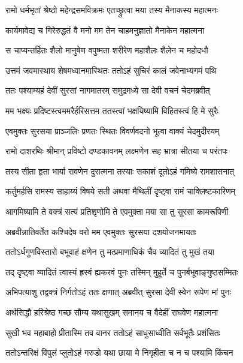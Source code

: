 \twolineshloka
{रामो धर्मभृतां श्रेष्ठो महेन्द्रसमविक्रमः}
{एतच्छ्रुत्वा मया तस्य मैनाकस्य महात्मनः} %

\twolineshloka
{कार्यमावेद्य च गिरेरुद्धतं वै मनो मम}
{तेन चाहमनुज्ञातो मैनाकेन महात्मना} %

\twolineshloka
{स चाप्यन्तर्हितः शैलो मानुषेण वपुष्मता}
{शरीरेण महाशैलः शैलेन च महोदधौ} %

\twolineshloka
{उत्तमं जवमास्थाय शेषमध्वानमास्थितः}
{ततोऽहं सुचिरं कालं जवेनाभ्यगमं पथि} %

\twolineshloka
{ततः पश्याम्यहं देवीं सुरसां नागमातरम्}
{समुद्रमध्ये सा देवी वचनं चेदमब्रवीत्} %

\twolineshloka
{मम भक्ष्यः प्रदिष्टस्त्वममरैर्हरिसत्तम}
{ततस्त्वां भक्षयिष्यामि विहितस्त्वं हि मे सुरैः} %

\twolineshloka
{एवमुक्तः सुरसया प्राञ्जलिः प्रणतः स्थितः}
{विवर्णवदनो भूत्वा वाक्यं चेदमुदीरयम्} %

\twolineshloka
{रामो दाशरथिः श्रीमान् प्रविष्टो दण्डकावनम्}
{लक्ष्मणेन सह भ्रात्रा सीतया च परंतपः} %

\twolineshloka
{तस्य सीता हृता भार्या रावणेन दुरात्मना}
{तस्याः सकाशं दूतोऽहं गमिष्ये रामशासनात्} %

\twolineshloka
{कर्तुमर्हसि रामस्य साहाय्यं विषये सती}
{अथवा मैथिलीं दृष्ट्वा रामं चाक्लिष्टकारिणम्} %

\twolineshloka
{आगमिष्यामि ते वक्त्रं सत्यं प्रतिशृणोमि ते}
{एवमुक्ता मया सा तु सुरसा कामरूपिणी} %

\twolineshloka
{अब्रवीन्नातिवर्तेत कश्चिदेष वरो मम}
{एवमुक्तः सुरसया दशयोजनमायतः} %

\twolineshloka
{ततोऽर्धगुणविस्तारो बभूवाहं क्षणेन तु}
{मत्प्रमाणाधिकं चैव व्यादितं तु मुखं तया} %

\twolineshloka
{तद् दृष्ट्वा व्यादितं त्वास्यं ह्रस्वं ह्यकरवं पुनः}
{तस्मिन् मुहूर्ते च पुनर्बभूवाङ्गुष्ठसम्मितः} %

\twolineshloka
{अभिपत्याशु तद्वक्त्रं निर्गतोऽहं ततः क्षणात्}
{अब्रवीत् सुरसा देवी स्वेन रूपेण मां पुनः} %

\twolineshloka
{अर्थसिद्धौ हरिश्रेष्ठ गच्छ सौम्य यथासुखम्}
{समानय च वैदेहीं राघवेण महात्मना} %

\twolineshloka
{सुखी भव महाबाहो प्रीतास्मि तव वानर}
{ततोऽहं साधुसाध्वीति सर्वभूतैः प्रशंसितः} %

\twolineshloka
{ततोऽन्तरिक्षं विपुलं प्लुतोऽहं गरुडो यथा}
{छाया मे निगृहीता च न च पश्यामि किंचन} %

